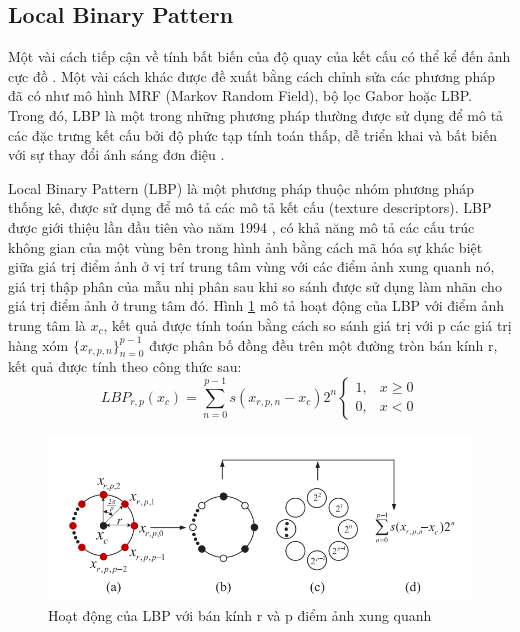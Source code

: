 \newpage
\subsection{Local Binary Pattern}
\label{sec:lbp}
Một vài cách tiếp cận về tính bất biến của độ quay của kết cấu có thể kể đến ảnh cực đồ \cite{polarograms}. Một vài cách khác được đề xuất bằng cách chỉnh sửa các phương pháp đã có như mô hình MRF (Markov Random Field), bộ lọc Gabor hoặc LBP. Trong đó, LBP là một trong những phương pháp thường được sử dụng để mô tả các đặc trưng kết cấu bởi độ phức tạp tính toán thấp, dễ triển khai và bất biến với sự thay đổi ánh sáng đơn điệu \cite{Liu2016}.

Local Binary Pattern (LBP) là một phương pháp thuộc nhóm phương pháp thống kê, được sử dụng để mô tả các mô tả kết cấu (texture descriptors). LBP được giới thiệu lần đầu tiên vào năm 1994 \cite{firstLBP}, có khả năng mô tả các cấu trúc không gian của một vùng bên trong hình ảnh bằng cách mã hóa sự khác biệt giữa giá trị điểm ảnh ở vị trí trung tâm vùng với các điểm ảnh xung quanh nó, giá trị thập phân của mẫu nhị phân sau khi so sánh được sử dụng làm nhãn cho giá trị điểm ảnh ở trung tâm đó. Hình \ref{fig:lbp_oper} mô tả hoạt động của LBP với điểm ảnh trung tâm là  $x_c$, kết quả được tính toán bằng cách so sánh giá trị với p các giá trị hàng xóm $\{x_{r, p, n}\}_{n=0}^{p-1}$ được phân bố đồng đều trên một đường tròn bán kính r, kết quả được tính theo công thức sau:
\begin{equation}
	LBP_{r, p}(x_c) = \sum_{n=0}^{p-1}s(x_{r,p, n} -x_c)2^n 
\begin{cases} 
1, & x \geq 0 \\ 
0, & x < 0 
\end{cases}
\end{equation}


\begin{figure} [h]
	\centering
	\includegraphics[width= 1\linewidth]{figures/lbp_oper.png}
	\caption{Hoạt động của LBP với bán kính r và p điểm ảnh xung quanh \cite{Liu2016}}
	\label{fig:lbp_oper}
\end{figure} 

